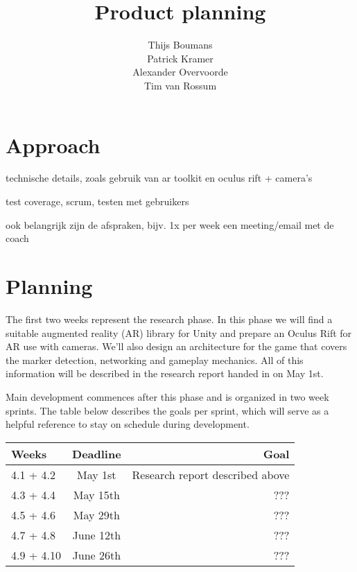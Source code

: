 \documentclass[11pt] {article}
\title{Product planning}
\author{Thijs Boumans\\ Patrick Kramer\\ Alexander Overvoorde\\ Tim van Rossum}
\date{}
\begin{document}
\maketitle



\section{Approach}

technische details, zoals gebruik van ar toolkit en oculus rift + camera's

test coverage, scrum, testen met gebruikers

ook belangrijk zijn de afspraken, bijv. 1x per week een meeting/email met de coach

\section{Planning}

The first two weeks represent the research phase. In this phase we will find a suitable augmented reality (AR) library for Unity and prepare an Oculus Rift for AR use with cameras. We'll also design an architecture for the game that covers the marker detection, networking and gameplay mechanics. All of this information will be described in the research report handed in on May 1st.

Main development commences after this phase and is organized in two week sprints. The table below describes the goals per sprint, which will serve as a helpful reference to stay on schedule during development.

\begin{tabular}{|l|c|r|}
	\hline
	Weeks & Deadline & Goal \\ \hline
	4.1 + 4.2 & May 1st & Research report described above \\ \hline
	4.3 + 4.4 & May 15th & ??? \\ \hline
	4.5 + 4.6 & May 29th & ??? \\ \hline
	4.7 + 4.8 & June 12th & ??? \\ \hline
	4.9 + 4.10 & June 26th & ??? \\ \hline
\end{tabular}
\end{document}
